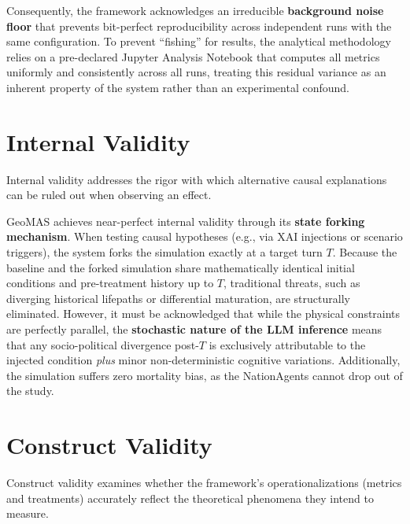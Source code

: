 Consequently, the framework acknowledges an irreducible \textbf{background noise floor} that prevents bit-perfect reproducibility across independent runs with the same configuration. To prevent ``fishing'' for results, the analytical methodology relies on a pre-declared Jupyter Analysis Notebook that computes all metrics uniformly and consistently across all runs, treating this residual variance as an inherent property of the system rather than an experimental confound.

\section{Internal Validity}
Internal validity addresses the rigor with which alternative causal explanations can be ruled out when observing an effect. 

GeoMAS achieves near-perfect internal validity through its \textbf{state forking mechanism}. When testing causal hypotheses (e.g., via XAI injections or scenario triggers), the system forks the simulation exactly at a target turn $T$. Because the baseline and the forked simulation share mathematically identical initial conditions and pre-treatment history up to $T$, traditional threats, such as diverging historical lifepaths or differential maturation, are structurally eliminated. However, it must be acknowledged that while the physical constraints are perfectly parallel, the \textbf{stochastic nature of the LLM inference} means that any socio-political divergence post-$T$ is exclusively attributable to the injected condition \textit{plus} minor non-deterministic cognitive variations. Additionally, the simulation suffers zero mortality bias, as the NationAgents cannot drop out of the study.

\section{Construct Validity}
Construct validity examines whether the framework's operationalizations (metrics and treatments) accurately reflect the theoretical phenomena they intend to measure.

